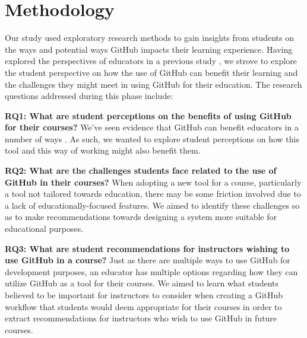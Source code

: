 \section{Methodology}
Our study used exploratory research methods \cite{easterbrook2008selecting} to gain insights from students on the ways and potential ways GitHub impacts their learning experience. Having explored the perspectives of educators in a previous study \cite{zagalsky}, we strove to explore the student perspective on how the use of GitHub can benefit their learning and the challenges they might meet in using GitHub for their education. The research questions addressed during this phase include:

\textbf{RQ1: What are student perceptions on the benefits of using GitHub for their courses?} We've seen evidence that GitHub can benefit educators in a number of ways \cite{zagalsky}. As such, we wanted to explore student perceptions on how this tool and this way of working might also benefit them.

\textbf{RQ2: What are the challenges students face related to the use of GitHub in their courses?} When adopting a new tool for a course, particularly a tool not tailored towards education, there may be some friction involved due to a lack of educationally-focused features. We aimed to identify these challenges so as to make recommendations towards designing a system more suitable for educational purposes.

\textbf{RQ3: What are student recommendations for instructors wishing to use GitHub in a course?} Just as there are multiple ways to use GitHub for development purposes, an educator has multiple options regarding how they can utilize GitHub as a tool for their courses. We aimed to learn what students believed to be important for instructors to consider when creating a GitHub workflow that students would deem appropriate for their courses in order to extract recommendations for instructors who wish to use GitHub in future courses.


